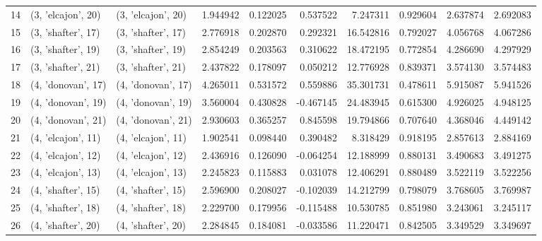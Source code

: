 \begin{tabular}{lllrrrrrrr}
14 &  (3, 'elcajon', 20) &  (3, 'elcajon', 20) &  1.944942 &   0.122025 &  0.537522 &   7.247311 &  0.929604 &   2.637874 &  2.692083 \\
15 &  (3, 'shafter', 17) &  (3, 'shafter', 17) &  2.776918 &   0.202870 &  0.292321 &  16.542816 &  0.792027 &   4.056768 &  4.067286 \\
16 &  (3, 'shafter', 19) &  (3, 'shafter', 19) &  2.854249 &   0.203563 &  0.310622 &  18.472195 &  0.772854 &   4.286690 &  4.297929 \\
17 &  (3, 'shafter', 21) &  (3, 'shafter', 21) &  2.437822 &   0.178097 &  0.050212 &  12.776928 &  0.839371 &   3.574130 &  3.574483 \\
18 &  (4, 'donovan', 17) &  (4, 'donovan', 17) &  4.265011 &   0.531572 &  0.559886 &  35.301731 &  0.478611 &   5.915087 &  5.941526 \\
19 &  (4, 'donovan', 19) &  (4, 'donovan', 19) &  3.560004 &   0.430828 & -0.467145 &  24.483945 &  0.615300 &   4.926025 &  4.948125 \\
20 &  (4, 'donovan', 21) &  (4, 'donovan', 21) &  2.930603 &   0.365257 &  0.845598 &  19.794866 &  0.707640 &   4.368046 &  4.449142 \\
21 &  (4, 'elcajon', 11) &  (4, 'elcajon', 11) &  1.902541 &   0.098440 &  0.390482 &   8.318429 &  0.918195 &   2.857613 &  2.884169 \\
22 &  (4, 'elcajon', 12) &  (4, 'elcajon', 12) &  2.436916 &   0.126090 & -0.064254 &  12.188999 &  0.880131 &   3.490683 &  3.491275 \\
23 &  (4, 'elcajon', 13) &  (4, 'elcajon', 13) &  2.245823 &   0.115883 &  0.031078 &  12.406291 &  0.880489 &   3.522119 &  3.522256 \\
24 &  (4, 'shafter', 15) &  (4, 'shafter', 15) &  2.596900 &   0.208027 & -0.102039 &  14.212799 &  0.798079 &   3.768605 &  3.769987 \\
25 &  (4, 'shafter', 18) &  (4, 'shafter', 18) &  2.229700 &   0.179956 & -0.115488 &  10.530785 &  0.851980 &   3.243061 &  3.245117 \\
26 &  (4, 'shafter', 20) &  (4, 'shafter', 20) &  2.284845 &   0.184081 & -0.033586 &  11.220471 &  0.842505 &   3.349529 &  3.349697 \\
\bottomrule
\end{tabular}
